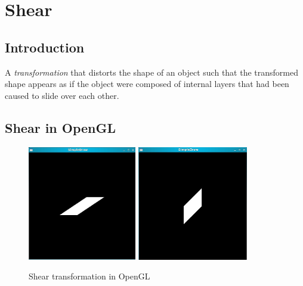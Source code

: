 \documentclass[a4paper,12pt,titlepage,twosided]{article}
\begin{document}
\pagebreak
\section{Shear}
	\subsection{Introduction}
	A \emph{transformation} that distorts the shape of an object such that the transformed shape appears as if the object were composed of internal layers that had been caused to slide over each other.

	\subsection{Shear in OpenGL}
	
	\begin{figure}
		\centering
		\includegraphics[height=50mm]{Images_final/shear_square.jpg}
		\includegraphics[height=50mm]{Images_final/shear_square_along_y.jpg}
		\caption{Shear transformation in OpenGL}
		\label{fig:shear}
	\end{figure}

	\begin{code}

	\end{code}


\pagebreak
\end{document}
